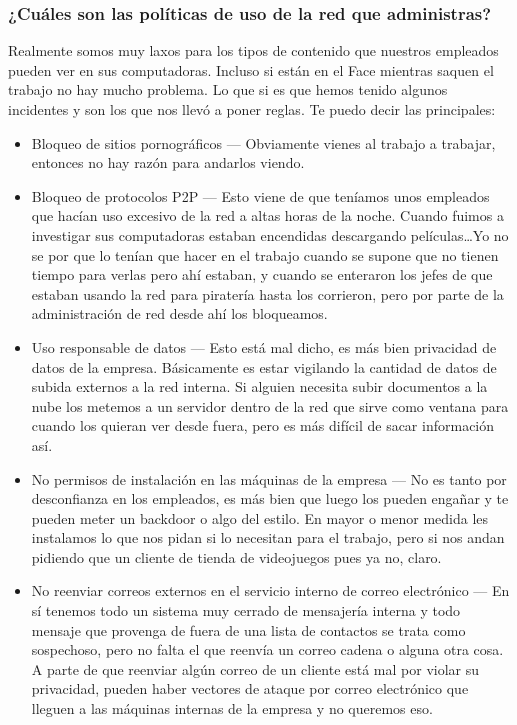 \documentclass[../main.tex]{subfiles}
\begin{document}
\subsubsection*{¿Cuáles son las políticas de uso de la red que administras?}
Realmente somos muy laxos para los tipos de contenido que nuestros empleados pueden ver en sus computadoras. Incluso si están en el Face mientras saquen el trabajo no hay mucho problema. Lo que si es que hemos tenido algunos incidentes y son los que nos llevó a poner reglas. Te puedo decir las principales:
\begin{itemize}
    \item Bloqueo de sitios pornográficos --- Obviamente vienes al trabajo a trabajar, entonces no hay razón para andarlos viendo.
    \item Bloqueo de protocolos P2P --- Esto viene de que teníamos unos empleados que hacían uso excesivo de la red a altas horas de la noche. Cuando fuimos a investigar sus computadoras estaban encendidas descargando películas\ldots Yo no se por que lo tenían que hacer en el trabajo cuando se supone que no tienen tiempo para verlas pero ahí estaban, y cuando se enteraron los jefes de que estaban usando la red para piratería hasta los corrieron, pero por parte de la administración de red desde ahí los bloqueamos.
    \item Uso responsable de datos --- Esto está mal dicho, es más bien privacidad de datos de la empresa. Básicamente es estar vigilando la cantidad de datos de subida externos a la red interna. Si alguien necesita subir documentos a la nube los metemos a un servidor dentro de la red que sirve como ventana para cuando los quieran ver desde fuera, pero es más difícil de sacar información así.
    \item No permisos de instalación en las máquinas de la empresa --- No es tanto por desconfianza en los empleados, es más bien que luego los pueden engañar y te pueden meter un backdoor o algo del estilo. En mayor o menor medida les instalamos lo que nos pidan si lo necesitan para el trabajo, pero si nos andan pidiendo que un cliente de tienda de videojuegos pues ya no, claro.
    \item No reenviar correos externos en el servicio interno de correo electrónico --- En sí tenemos todo un sistema muy cerrado de mensajería interna y todo mensaje que provenga de fuera de una lista de contactos se trata como sospechoso, pero no falta el que reenvía un correo cadena o alguna otra cosa. A parte de que reenviar algún correo de un cliente está mal por violar su privacidad, pueden haber vectores de ataque por correo electrónico que lleguen a las máquinas internas de la empresa y no queremos eso.

\end{itemize}
\end{document}
